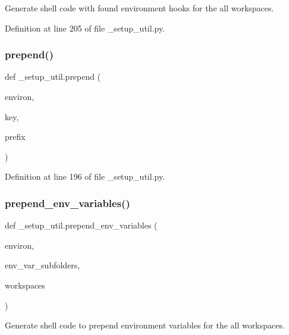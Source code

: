 \begin{DoxyVerb}Generate shell code with found environment hooks for the all workspaces.\end{DoxyVerb}
 

Definition at line 205 of file \+\_\+setup\+\_\+util.\+py.

\mbox{\label{namespace__setup__util_ae78d86b2c4279f5b8b1acaa146c35802}} 
\subsubsection{\texorpdfstring{prepend()}{prepend()}}
{\footnotesize\ttfamily def \+\_\+setup\+\_\+util.\+prepend (\begin{DoxyParamCaption}\item[{}]{environ,  }\item[{}]{key,  }\item[{}]{prefix }\end{DoxyParamCaption})}



Definition at line 196 of file \+\_\+setup\+\_\+util.\+py.

\mbox{\label{namespace__setup__util_a832417d18b85bd1d276a87547e86f860}} 
\subsubsection{\texorpdfstring{prepend\+\_\+env\+\_\+variables()}{prepend\_env\_variables()}}
{\footnotesize\ttfamily def \+\_\+setup\+\_\+util.\+prepend\+\_\+env\+\_\+variables (\begin{DoxyParamCaption}\item[{}]{environ,  }\item[{}]{env\+\_\+var\+\_\+subfolders,  }\item[{}]{workspaces }\end{DoxyParamCaption})}

\begin{DoxyVerb}Generate shell code to prepend environment variables for the all workspaces.\end{DoxyVerb}
 

